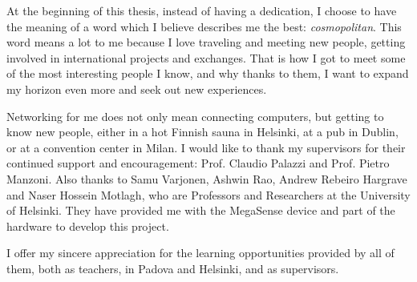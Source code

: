 
At the beginning of this thesis, instead of having a dedication, I choose to have the meaning of a word which I believe describes me the best: \textit{cosmopolitan}.
This word means a lot to me because I love traveling and meeting new people, getting involved in international projects and exchanges.
That is how I got to meet some of the most interesting people I know, and why thanks to them, I want to expand my horizon even more and seek out new experiences.

Networking for me does not only mean connecting computers, but getting to know new people, either in a hot Finnish sauna in Helsinki, at a pub in Dublin, or at a convention center in Milan.
\newline
\newline
\indent
I would like to thank my supervisors for their continued support and encouragement: Prof. Claudio Palazzi and Prof. Pietro Manzoni.
Also thanks to Samu Varjonen, Ashwin Rao, Andrew Rebeiro Hargrave and ‪Naser Hossein Motlagh‬, who are Professors and Researchers at the University of Helsinki.
They have provided me with the MegaSense device and part of the hardware to develop this project.

I offer my sincere appreciation for the learning opportunities provided by all of them, both as teachers, in Padova and Helsinki, and as supervisors.